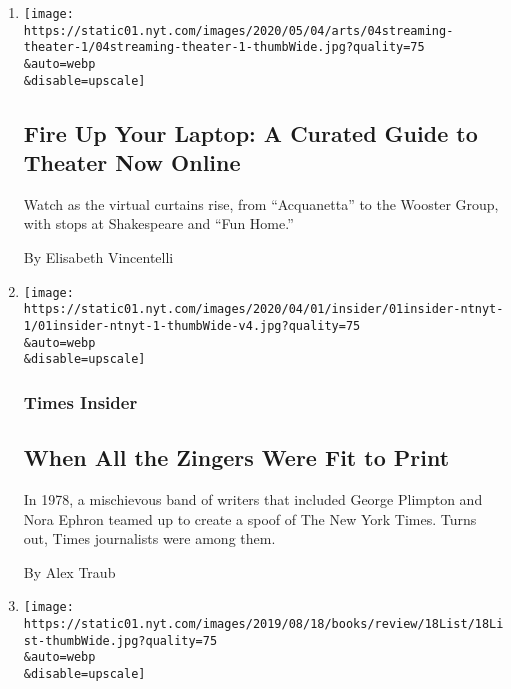 \begin{enumerate}
\def\labelenumi{\arabic{enumi}.}
\item
  \href{/2020/05/04/theater/theater-streaming-coronavirus.html}{}

  \texttt{[image: https://static01.nyt.com/images/2020/05/04/arts/04streaming-theater-1/04streaming-theater-1-thumbWide.jpg?quality=75\\\&auto=webp\\\&disable=upscale]}

  \hypertarget{fire-up-your-laptop-a-curated-guide-to-theater-now-online}{%
  \subsection{Fire Up Your Laptop: A Curated Guide to Theater Now
  Online}\label{fire-up-your-laptop-a-curated-guide-to-theater-now-online}}

  Watch as the virtual curtains rise, from ``Acquanetta'' to the Wooster
  Group, with stops at Shakespeare and ``Fun Home.''

  By Elisabeth Vincentelli
\item
  \href{/2020/04/01/reader-center/times-satire-history.html}{}

  \texttt{[image: https://static01.nyt.com/images/2020/04/01/insider/01insider-ntnyt-1/01insider-ntnyt-1-thumbWide-v4.jpg?quality=75\\\&auto=webp\\\&disable=upscale]}

  \hypertarget{times-insider}{%
  \subsubsection{Times Insider}\label{times-insider}}

  \hypertarget{when-all-the-zingers-were-fit-to-print}{%
  \subsection{When All the Zingers Were Fit to
  Print}\label{when-all-the-zingers-were-fit-to-print}}

  In 1978, a mischievous band of writers that included George Plimpton
  and Nora Ephron teamed up to create a spoof of The New York Times.
  Turns out, Times journalists were among them.

  By Alex Traub
\item
  \href{/2019/08/09/books/review/inside-the-list-1969-best-sellers.html}{}

  \texttt{[image: https://static01.nyt.com/images/2019/08/18/books/review/18List/18List-thumbWide.jpg?quality=75\\\&auto=webp\\\&disable=upscale]}


\end{enumerate}

